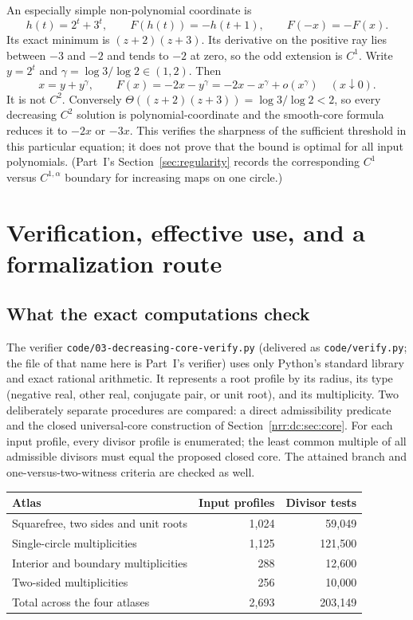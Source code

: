 \documentclass[11pt,letterpaper]{article}
\theoremstyle{definition}
\theoremstyle{remark}
\begin{document}
An especially simple non-polynomial coordinate is
\[
 h(t)=2^t+3^t,\qquad F(h(t))=-h(t+1),\qquad F(-x)=-F(x).
\]
Its exact minimum is $(z+2)(z+3)$. Its derivative on the positive
ray lies between $-3$ and $-2$ and tends to $-2$ at zero, so the
odd extension is $C^1$. Write $y=2^t$ and
$\gamma=\log3/\log2\in(1,2)$. Then
\[
 x=y+y^\gamma,\qquad F(x)=-2x-y^\gamma
       =-2x-x^\gamma+o(x^\gamma)\quad(x\downarrow0).
\]
It is not $C^2$. Conversely $\Theta((z+2)(z+3))=\log3/\log2<2$,
so every decreasing $C^2$ solution is polynomial-coordinate and the
smooth-core formula reduces it to $-2x$ or $-3x$.
This verifies the sharpness of the sufficient threshold in this
particular equation; it does not prove that the bound is optimal for
all input polynomials. (Part~I's Section~\ref{sec:regularity} records the
corresponding $C^1$ versus $C^{1,\alpha}$ boundary for increasing maps on one
circle.)

\section{Verification, effective use, and a formalization route}
\label{nrr:dc:sec:verification}

\subsection{What the exact computations check}

The verifier \nolinkurl{code/03-decreasing-core-verify.py} (delivered as
\texttt{code/verify.py}; the file of that name here is Part~I's verifier)
uses only Python's standard library and exact rational arithmetic. It
represents a root profile by its radius, its type (negative real, other real,
conjugate pair, or unit root), and its multiplicity. Two deliberately separate
procedures are compared: a direct admissibility predicate and the closed
universal-core construction of Section~\ref{nrr:dc:sec:core}. For each input
profile, every divisor profile is enumerated; the least common multiple of all
admissible divisors must equal the proposed closed core. The attained
branch and one-versus-two-witness criteria are checked as well.

\begin{center}
\begin{tabular}{@{}lrr@{}}
\toprule
Atlas & Input profiles & Divisor tests\\
\midrule
Squarefree, two sides and unit roots & 1,024 & 59,049\\
Single-circle multiplicities & 1,125 & 121,500\\
Interior and boundary multiplicities & 288 & 12,600\\
Two-sided multiplicities & 256 & 10,000\\
\midrule
Total across the four atlases & 2,693 & 203,149\\
\bottomrule
\end{tabular}
\end{center}
\end{document}
